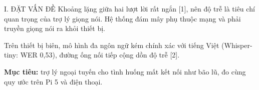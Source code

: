 \documentclass{article}
\begin{document}
\begin{minipage}[t][\textheight][t]{\textwidth}
\vspace{7pt}
\newlength{\cao}\setlength{\cao}{\dimexpr\textheight-127mm\relax}\newlength{\caoa}\setlength{\caoa}{.38\cao}\newlength{\caob}\setlength{\caob}{\dimexpr.62\cao-4pt\relax}
\newlength{\rong}\setlength{\rong}{138mm}
\noindent\begin{cotp}{\rong}{\cao}{I. ĐẶT VẤN ĐỀ}
Khoảng lặng giữa hai lượt lời rất ngắn [1], nên độ trễ là tiêu chí quan trọng của trợ lý giọng nói. Hệ thống đám mây phụ thuộc mạng và phải truyền giọng nói ra khỏi thiết bị.

Trên thiết bị biên, mô hình đa ngôn ngữ kém chính xác với tiếng Việt (Whisper-tiny: WER 0,53), đường ống nối tiếp cộng dồn độ trễ [2].

\textbf{\color{dam}Mục tiêu:} trợ lý ngoại tuyến cho tình huống mất kết nối như bão lũ, đo cùng quy ước trên Pi 5 và điện thoại.


\end{cotp}
\end{minipage}
\end{document}

